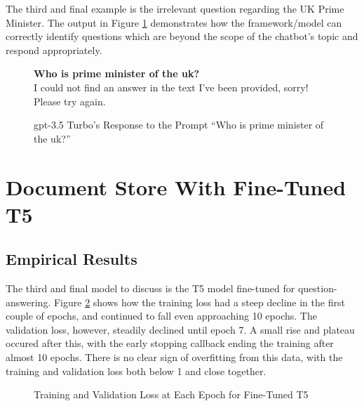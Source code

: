 The third and final example is the irrelevant question regarding the UK Prime Minister. The output in Figure \ref{fig:results_gpt_ex3} demonstrates how the framework/model can correctly identify questions which are beyond the scope of the chatbot's topic and respond appropriately.

\begin{figure}[ht!]
    \begin{itquote}
        \textbf{Who is prime minister of the uk?} \\
        I could not find an answer in the text I've been provided, sorry! Please try again.
    \end{itquote}
    \caption{\acrshort{gpt}-3.5 Turbo's Response to the Prompt ``Who is prime minister of the uk?''}
    \label{fig:results_gpt_ex3}
\end{figure}

\section{Document Store With Fine-Tuned T5}\label{sec:results_t5}
\subsection{Empirical Results}\label{sec:results_t5_empirical}
The third and final model to discuss is the T5 model fine-tuned for question-answering. Figure \ref{fig:results_t5_loss} shows how the training loss had a steep decline in the first couple of epochs, and continued to fall even approaching 10 epochs. The validation loss, however, steadily declined until epoch 7. A small rise and plateau occured after this, with the early stopping callback ending the training after almost 10 epochs. There is no clear sign of overfitting from this data, with the training and validation loss both below 1 and close together. 

\begin{figure}[ht!]
\centering
\caption{Training and Validation Loss at Each Epoch for Fine-Tuned T5}
\label{fig:results_t5_loss}
\end{figure}

